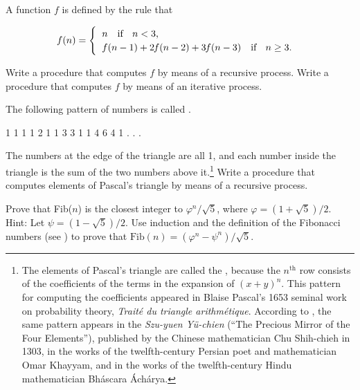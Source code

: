 \begin{exerciseGroup}
\label{Exercise 1.11}
 A function \( f \) is defined by
the rule that

$$
f(n) =
\begin{cases}
\;\; n \quad \text{if \; \( n < 3 \),} \\
\;\; f(n-1) + 2\kern-0.08em f(n-2) + 3\kern-0.08em f(n-3) \quad \text{if \; \( n \ge 3 \).}
\end{cases}
$$

Write a procedure that computes \( f \) by means of a recursive process.  Write a procedure that
computes \( f \) by means of an iterative process.

\label{Exercise 1.12}
 The following pattern of numbers
is called .

\begin{example}
        1
      1   1
    1   2   1
  1   3   3   1
1   4   6   4   1
      . . .
\end{example}

The numbers at the edge of the triangle are all 1, and each number inside the
triangle is the sum of the two numbers above it.\footnote{The elements of
Pascal's triangle are called the , because the
\( n^{\mathrm{th}} \) row consists of the coefficients of the terms in the expansion of
\( (x + y)^n \).  This pattern for computing the coefficients appeared in
Blaise Pascal's 1653 seminal work on probability theory, \textit{Trait\'e du
triangle arithm\'etique}.  According to , the same pattern appears
in the \textit{Szu-yuen Y\"u-chien} (``The Precious Mirror of the Four
Elements''), published by the Chinese mathematician Chu Shih-chieh in 1303, in
the works of the twelfth-century Persian poet and mathematician Omar Khayyam,
and in the works of the twelfth-century Hindu mathematician Bh\'ascara
\'Ach\'arya.} Write a procedure that computes elements of Pascal's triangle by
means of a recursive process.

\label{Exercise 1.13}
 Prove that Fib(\( n \)) is
the closest integer to \( \varphi^n / \sqrt{5} \), where \( \varphi = (1 +
\sqrt{5}) / 2 \).  Hint: Let \( \psi = (1 - \sqrt{5}) / 2 \).
Use induction and the definition of the Fibonacci numbers (see )
to prove that \( \text{Fib}(n) = (\varphi^n - \psi^n) / \sqrt{5} \).
\end{exerciseGroup}

